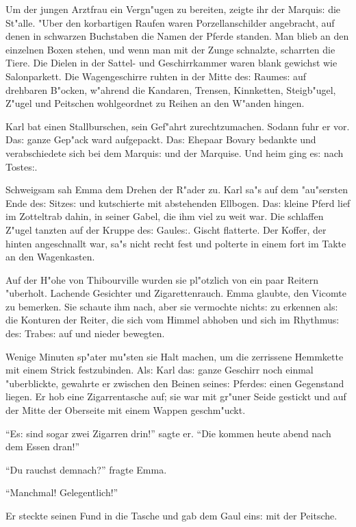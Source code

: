 \documentclass[oneside,12pt]{book}
\newcommand{\s}{s:}%
\begin{document}
Um der jungen Arztfrau ein Vergn"ugen zu bereiten, zeigte ihr der
Marqui{\s} die St"alle. "Uber den korbartigen Raufen waren
Porzellanschilder angebracht, auf denen in schwarzen Buchstaben
die Namen der Pferde standen. Man blieb an den einzelnen Boxen
stehen, und wenn man mit der Zunge schnalzte, scharrten die Tiere.
Die Dielen in der Sattel- und Geschirrkammer waren blank gewichst
wie Salonparkett. Die Wagengeschirre ruhten in der Mitte de{\s}
Raume{\s} auf drehbaren B"ocken, w"ahrend die Kandaren, Trensen,
Kinnketten, Steigb"ugel, Z"ugel und Peitschen wohlgeordnet zu
Reihen an den W"anden hingen.

Karl bat einen Stallburschen, sein Gef"ahrt zurechtzumachen.
Sodann fuhr er vor. Da{\s} ganze Gep"ack ward aufgepackt. Da{\s}
Ehepaar Bovary bedankte und verabschiedete sich bei dem Marqui{\s}
und der Marquise. Und heim ging e{\s} nach Toste{\s}.

Schweigsam sah Emma dem Drehen der R"ader zu. Karl sa"s auf dem
"au"sersten Ende de{\s} Sitze{\s} und kutschierte mit abstehenden
Ellbogen. Da{\s} kleine Pferd lief im Zotteltrab dahin, in seiner
Gabel, die ihm viel zu weit war. Die schlaffen Z"ugel tanzten auf
der Kruppe de{\s} Gaule{\s}. Gischt flatterte. Der Koffer, der
hinten angeschnallt war, sa"s nicht recht fest und polterte in
einem fort im Takte an den Wagenkasten.

Auf der H"ohe von Thibourville wurden sie pl"otzlich von ein paar
Reitern "uberholt. Lachende Gesichter und Zigarettenrauch. Emma
glaubte, den Vicomte zu bemerken. Sie schaute ihm nach, aber sie
vermochte nicht{\s} zu erkennen al{\s} die Konturen der Reiter,
die sich vom Himmel abhoben und sich im Rhythmu{\s} de{\s}
Trabe{\s} auf und nieder bewegten.

Wenige Minuten sp"ater mu"sten sie Halt machen, um die zerrissene
Hemmkette mit einem Strick fest\/zubinden. Al{\s} Karl da{\s} ganze
Geschirr noch einmal "uberblickte, gewahrte er zwischen den Beinen
seine{\s} Pferde{\s} einen Gegenstand liegen. Er hob eine
Zigarrentasche auf; sie war mit gr"uner Seide gestickt und auf der
Mitte der Oberseite mit einem Wappen geschm"uckt.

"`E{\s} sind sogar zwei Zigarren drin!"' sagte er. "`Die kommen
heute abend nach dem Essen dran!"'

"`Du rauchst demnach?"' fragte Emma.

"`Manchmal! Gelegentlich!"'

Er steckte seinen Fund in die Tasche und gab dem Gaul ein{\s} mit
der Peitsche.
\end{document}
